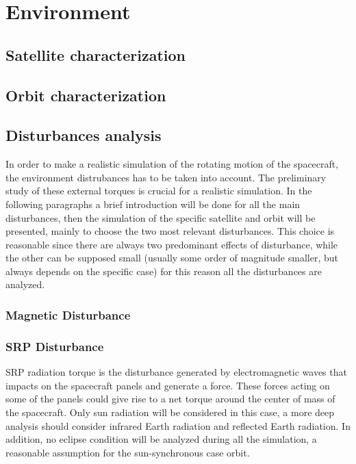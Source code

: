 \section{Environment}
\label{sec:environment}

\subsection{Satellite characterization }
\label{subsec:sat_characterization}


\subsection{Orbit characterization}
\label{subsec:orbit_characterization}

\subsection{Disturbances analysis}
\label{subsec:disturbances_analysis}
In order to make a realistic simulation of the rotating motion of the spacecraft, the environment 
distrubances has to be taken into account. The preliminary study of these external torques is 
crucial for a realistic simulation. In the following paragraphs a brief introduction will be 
done for all the main disturbances, then the simulation of the specific satellite and orbit
will be presented, mainly to choose the two most relevant disturbances. This choice is reasonable 
since there are always two predominant effects of disturbance, while the other can be supposed small 
(usually some order of magnitude smaller, but always depends on the specific case) for this reason
all the disturbances are analyzed. 


\subsubsection{Magnetic Disturbance}
\label{subsubsec:dist_mag}



\subsubsection{SRP Disturbance}
\label{subsubsec:dist_SRP}
SRP radiation torque is the disturbance generated by electromagnetic waves that impacts on
the spacecraft panels and generate a force. These forces acting on some of the panels could give rise to 
a net torque around the center of mass of the spacecraft. Only sun radiation will be considered 
in this case, a more deep analysis should consider infrared Earth radiation and reflected Earth radiation. 
In addition, no eclipse condition will be analyzed during all the simulation, a reasonable assumption for the 
sun-synchronous case orbit.

